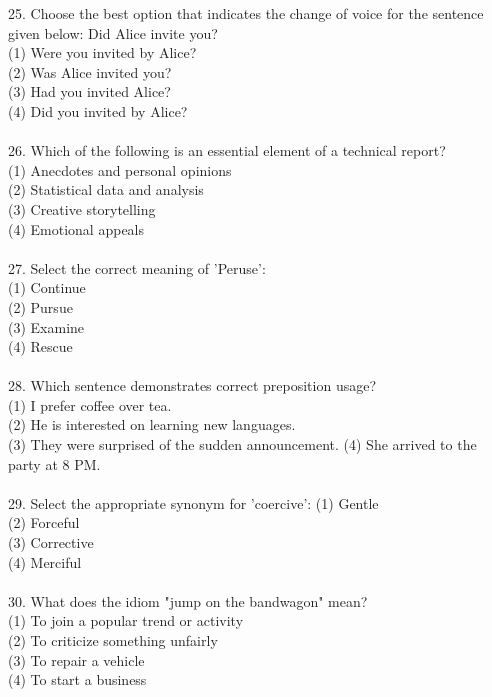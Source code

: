 \documentclass[10pt]{article}
\begin{document}
25. Choose the best option that indicates the change of voice for the sentence given below: Did Alice invite you?\\
(1) Were you invited by Alice?\\
(2) Was Alice invited you?\\
(3) Had you invited Alice?\\
(4) Did you invited by Alice?\\\\
26. Which of the following is an essential element of a technical report?\\
(1) Anecdotes and personal opinions\\
(2) Statistical data and analysis\\
(3) Creative storytelling\\
(4) Emotional appeals\\\\
27. Select the correct meaning of 'Peruse':\\
(1) Continue\\
(2) Pursue\\
(3) Examine\\
(4) Rescue\\\\
28. Which sentence demonstrates correct preposition usage?\\
(1) I prefer coffee over tea.\\
(2) He is interested on learning new languages.\\
(3) They were surprised of the sudden announcement. (4) She arrived to the party at 8 PM.\\\\
29. Select the appropriate synonym for 'coercive': (1) Gentle\\
(2) Forceful\\
(3) Corrective\\
(4) Merciful\\\\
30. What does the idiom "jump on the bandwagon" mean?\\
(1) To join a popular trend or activity\\
(2) To criticize something unfairly\\
(3) To repair a vehicle\\
(4) To start a business\\\\
\end{document}
